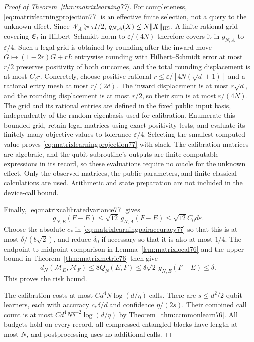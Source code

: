 \begin{proof}[Proof of Theorem~\ref{thm:matrixlearning77}]
For completeness, \eqref{eq:matrixlearningprojection77} is an
effective finite selection, not a query to the unknown effect.
Since $W_A\succeq\tau I/2$,
$g_{N,A}(X)\le N\|X\|_{\rm HS}$.  A finite rational grid covering
$\mathfrak E_d$ in Hilbert--Schmidt norm to
$\varepsilon/(4N)$ therefore covers it in $g_{N,A}$ to
$\varepsilon/4$.  Such a legal grid is obtained by rounding after
the inward move $G\mapsto(1-2r)G+rI$: entrywise rounding with
Hilbert--Schmidt error at most $r/2$ preserves positivity of both
outcomes, and the total rounding displacement is at most $C_dr$.
Concretely, choose positive rational
$r\le\varepsilon/[4N(\sqrt d+1)]$ and a rational entry mesh at
most $r/(2d)$.  The inward displacement is at most $r\sqrt d$,
and the rounding displacement is at most $r/2$, so their sum is
at most $\varepsilon/(4N)$.
The grid and its rational entries are defined in the fixed public
input basis, independently of the random eigenbasis used for
calibration.  Enumerate this bounded grid, retain legal matrices
using exact positivity tests, and evaluate its finitely many
objective values to tolerance $\varepsilon/4$.  Selecting the
smallest computed value proves
\eqref{eq:matrixlearningprojection77} with slack.  The calibration
matrices are algebraic, and the qubit subroutine's outputs are finite
computable expressions in its record, so these evaluations require
no oracle for the unknown effect.  Only the observed matrices, the
public parameters, and finite classical calculations are used.
Arithmetic and state preparation are not included in the device-call
bound.

Finally, \eqref{eq:matrixcalibratedvariance77} gives
\[
 g_{N,E}(F-E)\le\sqrt{12}\,g_{N,A}(F-E)
                  \le\sqrt{12}C_0d\varepsilon.
\]
Choose the absolute $c_*$ in
\eqref{eq:matrixlearningpairaccuracy77} so that this is at most
$\delta/(8\sqrt2)$, and reduce $\delta_0$ if necessary so that
it is also at most $1/4$.  The endpoint-to-midpoint comparison in
Lemma~\ref{lem:matrixlocal76} and the upper bound in
Theorem~\ref{thm:matrixmetric76} then give
\[
 d_N(\mathcal M_E,\mathcal M_F)
 \le8Q_N(E,F)\le8\sqrt2\,g_{N,E}(F-E)\le\delta.
\]
This proves the risk bound.

The calibration costs at most $Cd^4N\log(d/\eta)$ calls.  There
are $s\le d^2/2$ qubit learners, each with accuracy
$c_*\delta/d$ and confidence $\eta/(2s)$.  Their combined call
count is at most $Cd^4N\delta^{-2}\log(d/\eta)$ by
Theorem~\ref{thm:commonlearn76}.  All budgets hold on every record,
all compressed entangled blocks have length at most $N$, and
postprocessing uses no additional calls.


\end{proof}
